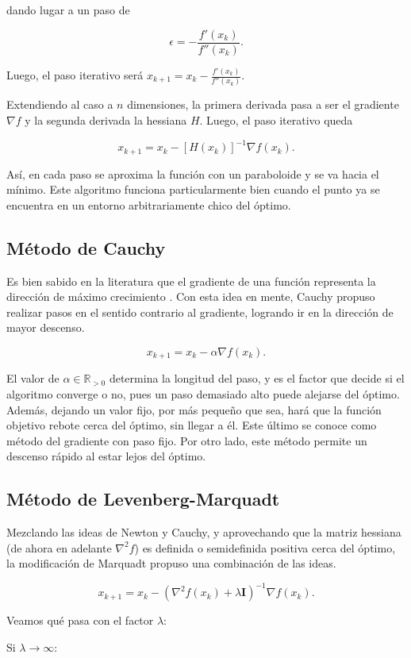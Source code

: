 \noindent dando lugar a un paso de 

$$
\epsilon = - \frac{f'(x_k)}{f''(x_k)}.
$$

Luego, el paso iterativo será $ x_{k+1} = x_k - \frac{f'(x_k)}{f''(x_k)} $.

Extendiendo al caso a $n$ dimensiones, la primera derivada pasa a ser el gradiente $\nabla f$ y la segunda derivada la hessiana $H$. Luego, el paso iterativo queda

$$
x_{k+1} = x_k - [H(x_k)]^{-1} \nabla f(x_k).
$$

Así, en cada paso se aproxima la función con un paraboloide y se va hacia el mínimo. Este algoritmo funciona particularmente bien cuando el punto ya se encuentra en un entorno arbitrariamente chico del óptimo.

\subsection{Método de Cauchy}
Es bien sabido en la literatura que el gradiente de una función representa la dirección de máximo crecimiento \cite{Joyce2014Multivariate}. Con esta idea en mente, Cauchy propuso realizar pasos en el sentido contrario al gradiente, logrando ir en la dirección de mayor descenso.

$$
x_{k+1} = x_k - \alpha \nabla f(x_k).
$$

El valor de $\alpha \in \mathbb{R}_{>0}$ determina la longitud del paso, y es el factor que decide si el algoritmo converge o no, pues un paso demasiado alto puede alejarse del óptimo. Además, dejando un valor fijo, por más pequeño que sea, hará que la función objetivo rebote cerca del óptimo, sin llegar a él. Este último se conoce como método del gradiente con paso fijo. Por otro lado, este método permite un descenso rápido al estar lejos del óptimo.

\subsection{Método de Levenberg-Marquadt}
Mezclando las ideas de Newton y Cauchy, y aprovechando que la matriz hessiana (de ahora en adelante $\nabla^2 f$) es definida o semidefinida positiva cerca del óptimo, la modificación de Marquadt propuso una combinación de las ideas.

$$
x_{k+1} = x_k -(\nabla^2f(x_k) + \lambda \mathbf{I})^{-1} \nabla f(x_k).
$$

Veamos qué pasa con el factor $\lambda$:

Si $\lambda \to \infty$:

